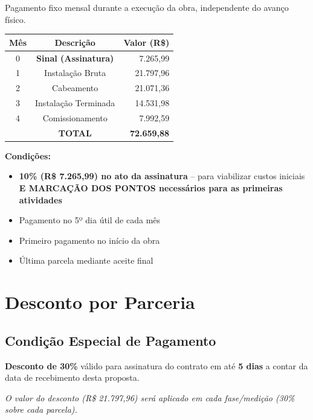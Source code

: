 \documentclass[12pt,a4paper]{article}
\renewenvironment{table}%
{\begin{center}%
\scriptsize%
\addtolength{\tabcolsep}{-2pt}%
}%
{\end{center}}
\begin{document}
Pagamento fixo mensal durante a execução da obra, independente do avanço físico.

\begin{table}
\centering
\begin{tabular}{ccr}
\toprule
\textbf{Mês} & \textbf{Descrição} & \textbf{Valor (R\$)} \\
\midrule
0 & \textbf{Sinal (Assinatura)} & 7.265,99 \\
1 & Instalação Bruta & 21.797,96 \\
2 & Cabeamento & 21.071,36 \\
3 & Instalação Terminada & 14.531,98 \\
4 & Comissionamento & 7.992,59 \\
\midrule
 & \textbf{TOTAL} & \textbf{72.659,88} \\
\bottomrule
\end{tabular}
\end{table}

\noindent\textbf{Condições:}
\begin{itemize}
\item \textbf{10\% (R\$ 7.265,99) no ato da assinatura} -- para viabilizar custos iniciais \textbf{E MARCAÇÃO DOS PONTOS necessários para as primeiras atividades}
\item Pagamento no 5º dia útil de cada mês
\item Primeiro pagamento no início da obra
\item Última parcela mediante aceite final
\end{itemize}

\pagebreak

\section{Desconto por Parceria}

\subsection{Condição Especial de Pagamento}

\textbf{Desconto de 30\%} válido para assinatura do contrato em até \textbf{5 dias} a contar da data de recebimento desta proposta.

\noindent\textit{O valor do desconto (R\$ 21.797,96) será aplicado em cada fase/medição (30\% sobre cada parcela).}
\end{document}
